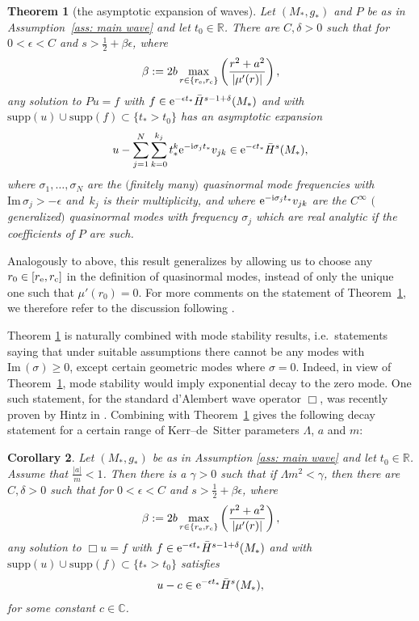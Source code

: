\documentclass[10pt,a4paper]{amsart}
\newcommand{\e}{\epsilon}
\renewcommand{\Im}{\mathrm{Im} \,}
\newcommand{\supp}{\mathrm{supp}}
\newcommand{\de}{\delta}
\renewcommand{\b}{\beta}
\newcommand{\abs}[1]{\left\lvert#1\right\rvert}
\newcommand{\s}{\sigma}
\newcommand{\R}[0]{\mathbb{R}}
\newcommand{\C}[0]{\mathbb{C}}
\numberwithin{equation}{section}
\newtheorem{Theorem}{Theorem}[section]
\newtheorem{Corollary}[Theorem]{Corollary}
\begin{document}
\begin{Theorem}[the asymptotic expansion of waves] \label{thm: asymptotic expansion} Let $(M_*, g_*)$ and $P$ be as in Assumption~{\rm\ref{ass: main wave}} and let $t_0 \in \R$.
There are $C, \de > 0$ such that for $0 < \e < C$ and $s > \frac12 + \b \e$, where
\[
	\b
		:= 2b \max_{r \in \{r_{\rm e}, r_{\rm c}\}} \left( \frac{r^2 + a^2}{\abs{\mu'(r)}} \right),
\]
any solution to $Pu = f$
with $f \in {\rm e}^{- \e t_*} \bar H^{s - 1 + \de}(M_*)$ and with $\supp(u) \cup \supp(f) \subset \{t_* > t_0\}$ has an asymptotic expansion
\begin{align*}
	u - \sum_{j = 1}^N \sum_{k = 0}^{k_j} t_*^k {\rm e}^{-{\rm i} \s_j t_*} v_{jk} \in {\rm e}^{- \e t_*} \bar H^s(M_*),
\end{align*}
where $\s_1, \hdots, \s_N$ are the $($finitely many$)$ quasinormal mode frequencies with $\Im \s_j > - \e$
and~$k_j$ is their multiplicity, and where ${\rm e}^{-{\rm i}\s_j t_*}v_{jk}$ are
the $C^\infty$ $($generalized$)$ quasinormal modes with frequency $\s_j$ which are
real analytic if the coefficients of $P$ are such.
\end{Theorem}

Analogously to above, this result generalizes \cite[Theorem~1.6]{PV2023} by allowing us to choose any~${r_0 \in [r_{\rm e}, r_{\rm c}]}$ in the definition of quasinormal modes, instead of only the unique one such that $\mu'(r_0) = 0$.
For more comments on the statement of Theorem~\ref{thm: asymptotic expansion}, we therefore refer to the discussion following \cite[Theorem~1.6]{PV2023}.

Theorem \ref{thm: asymptotic expansion} is naturally combined with mode stability results, i.e.~statements saying that under suitable assumptions there cannot be any modes with $\Im(\s) \geq 0$,
except certain geometric modes where $\s = 0$.
Indeed, in view of Theorem~\ref{thm: asymptotic expansion}, mode stability would imply exponential decay to the zero mode.
One such statement, for the standard d'Alembert wave operator $\Box$, was recently proven by Hintz in \cite{H2021}.
Combining \cite[Theorem~1.1]{H2021} with Theorem~\ref{thm: asymptotic expansion} gives the following decay statement for a certain range of Kerr--de~Sitter parameters $\Lambda$, $a$ and $m$:

\begin{Corollary}
Let $(M_*, g_*)$ be as in Assumption {\rm\ref{ass: main wave}} and let $t_0 \in \R$.
Assume that $\frac {\abs a}m < 1$.
Then there is a $\gamma > 0$ such that if $\Lambda m^2 < \gamma$, then there are $C, \de > 0$ such that for $0 < \e < C$ and $s > \frac12 + \b \e$,
where
\[
	\b
		:= 2b \max_{r \in \{r_{\rm e}, r_{\rm c}\}} \left( \frac{r^2 + a^2}{\abs{\mu'(r)}} \right),
\]
any solution to $\Box u = f$
with $f \in {\rm e}^{- \e t_*} \bar H^{s - 1 + \de}(M_*)$ and with $\supp(u) \cup \supp(f) \subset \{t_* > t_0\}$ satisfies
\begin{align*}
	u - c \in {\rm e}^{- \e t_*} \bar H^s(M_*),
\end{align*}
for some constant $c \in \C$.
\end{Corollary}
\end{document}
